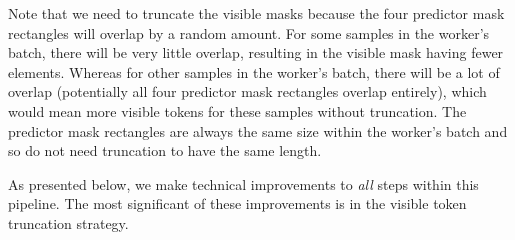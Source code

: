 Note that we need to truncate the visible masks because the four predictor mask rectangles will overlap by a random amount.
For some samples in the worker's batch, there will be very little overlap, resulting in the visible mask having fewer elements.
Whereas for other samples in the worker's batch, there will be a lot of overlap (potentially all four predictor mask rectangles overlap entirely), which would mean more visible tokens for these samples without truncation.
The predictor mask rectangles are always the same size within the worker's batch and so do not need truncation to have the same length.

As presented below, we make technical improvements to \textit{all} steps within this pipeline.
The most significant of these improvements is in the visible token truncation strategy.

